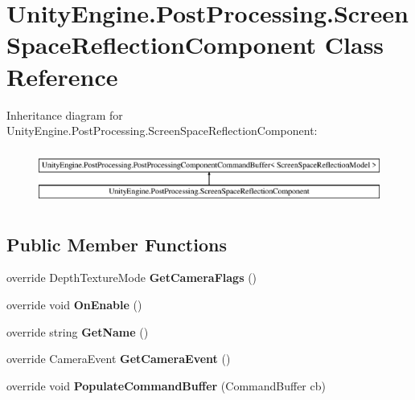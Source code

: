 \hypertarget{class_unity_engine_1_1_post_processing_1_1_screen_space_reflection_component}{}\section{Unity\+Engine.\+Post\+Processing.\+Screen\+Space\+Reflection\+Component Class Reference}
\label{class_unity_engine_1_1_post_processing_1_1_screen_space_reflection_component}
Inheritance diagram for Unity\+Engine.\+Post\+Processing.\+Screen\+Space\+Reflection\+Component\+:\begin{figure}[H]
\begin{center}
\leavevmode
\includegraphics[height=1.824104cm]{class_unity_engine_1_1_post_processing_1_1_screen_space_reflection_component}
\end{center}
\end{figure}
\subsection*{Public Member Functions}
\begin{DoxyCompactItemize}
\item 
\mbox{\label{class_unity_engine_1_1_post_processing_1_1_screen_space_reflection_component_aeaa198759ea4fae9a6ee5feac84730fa}} 
override Depth\+Texture\+Mode {\bfseries Get\+Camera\+Flags} ()
\item 
\mbox{\label{class_unity_engine_1_1_post_processing_1_1_screen_space_reflection_component_a0d58b4de3e36450e06df20a4de6bd84c}} 
override void {\bfseries On\+Enable} ()
\item 
\mbox{\label{class_unity_engine_1_1_post_processing_1_1_screen_space_reflection_component_ad4da13965c3b67798e594134f70505e3}} 
override string {\bfseries Get\+Name} ()
\item 
\mbox{\label{class_unity_engine_1_1_post_processing_1_1_screen_space_reflection_component_a696726c8892304b37695a69c900b2b97}} 
override Camera\+Event {\bfseries Get\+Camera\+Event} ()
\item 
\mbox{\label{class_unity_engine_1_1_post_processing_1_1_screen_space_reflection_component_a816b26c983d2e6b8723a049dafa72544}} 
override void {\bfseries Populate\+Command\+Buffer} (Command\+Buffer cb)
\end{DoxyCompactItemize}
